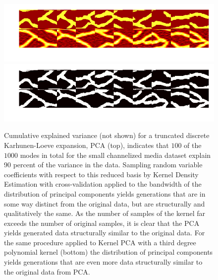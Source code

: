 \documentclass{article}
\begin{document}
\begin{figure}[h]
\centering
  \includegraphics[]{figures/OptSnapshots_32_KDESamples100.png}
  \includegraphics[]{figures/OptSnapshots_32_KDESamples100_KPCA.png}
  \caption{Cumulative explained variance (not shown) for a truncated discrete Karhunen-Loeve expansion, PCA (top), indicates that $100$ of the $1000$ modes in total for the small channelized media dataset explain 90 percent of the variance in the data.  Sampling random variable coefficients with respect to this reduced basis by Kernel Density Estimation with cross-validation applied to the bandwidth of the distribution of principal components yields generations that are in some way distinct from the original data, but are structurally and qualitatively the same.  As the number of samples of the kernel far exceeds the number of original samples, it is clear that the PCA yields generated data structurally similar to the original data.  For the same procedure applied to Kernel PCA with a third degree polynomial kernel (bottom) the distribution of principal components yields generations that are even more data structurally similar to the original data from PCA.}
\end{figure}\label{KDEPCA}
\end{document}
